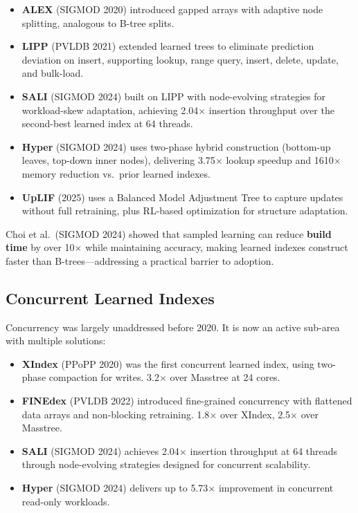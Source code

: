 \documentclass[11pt, a4paper]{article}
\begin{document}
\begin{itemize}[nosep]
    \item \textbf{ALEX} (SIGMOD 2020) introduced gapped arrays with adaptive
        node splitting, analogous to B-tree splits.
    \item \textbf{LIPP} (PVLDB 2021) extended learned trees to eliminate
        prediction deviation on insert, supporting lookup, range query,
        insert, delete, update, and bulk-load.
    \item \textbf{SALI} (SIGMOD 2024) built on LIPP with node-evolving
        strategies for workload-skew adaptation, achieving 2.04$\times$
        insertion throughput over the second-best learned index at 64 threads.
    \item \textbf{Hyper} (SIGMOD 2024) uses two-phase hybrid construction
        (bottom-up leaves, top-down inner nodes), delivering 3.75$\times$
        lookup speedup and 1610$\times$ memory reduction vs.\ prior
        learned indexes.
    \item \textbf{UpLIF} (2025) uses a Balanced Model Adjustment Tree to
        capture updates without full retraining, plus RL-based optimization
        for structure adaptation.
\end{itemize}

Choi et al.\ (SIGMOD 2024) showed that sampled learning can reduce
\textbf{build time} by over 10$\times$ while maintaining accuracy, making
learned indexes construct faster than B-trees---addressing a practical
barrier to adoption.

\subsection{Concurrent Learned Indexes}

Concurrency was largely unaddressed before 2020. It is now an active
sub-area with multiple solutions:

\begin{itemize}[nosep]
    \item \textbf{XIndex} (PPoPP 2020) was the first concurrent learned index,
        using two-phase compaction for writes. 3.2$\times$ over Masstree at
        24 cores.
    \item \textbf{FINEdex} (PVLDB 2022) introduced fine-grained concurrency
        with flattened data arrays and non-blocking retraining. 1.8$\times$
        over XIndex, 2.5$\times$ over Masstree.
    \item \textbf{SALI} (SIGMOD 2024) achieves 2.04$\times$ insertion
        throughput at 64 threads through node-evolving strategies designed
        for concurrent scalability.
    \item \textbf{Hyper} (SIGMOD 2024) delivers up to 5.73$\times$
        improvement in concurrent read-only workloads.
\end{itemize}
\end{document}

